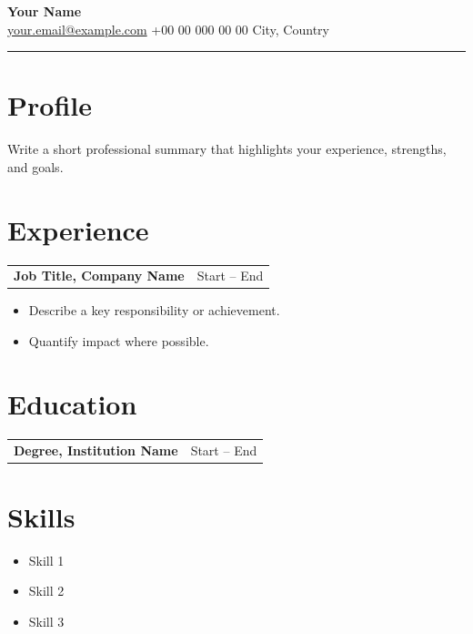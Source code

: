 \documentclass[11pt,a4paper]{article}
\begin{document}
\begin{center}
{\LARGE \textbf{Your Name}} \\[0.4em]
\href{mailto:your.email@example.com}{your.email@example.com} \quad
+00 00 000 00 00 \quad
City, Country
\end{center}

\vspace{0.5em}
\hrule
\vspace{1em}

\section*{Profile}

Write a short professional summary that highlights your experience, strengths, and goals.

\section*{Experience}

\begin{tabularx}{\textwidth}{Xr}
\textbf{Job Title, Company Name} & Start -- End \\
\end{tabularx}

\begin{itemize}
\item Describe a key responsibility or achievement.
\item Quantify impact where possible.
\end{itemize}

\section*{Education}

\begin{tabularx}{\textwidth}{Xr}
\textbf{Degree, Institution Name} & Start -- End \\
\end{tabularx}

\section*{Skills}

\begin{itemize}
\item Skill 1
\item Skill 2
\item Skill 3
\end{itemize}
\end{document}
